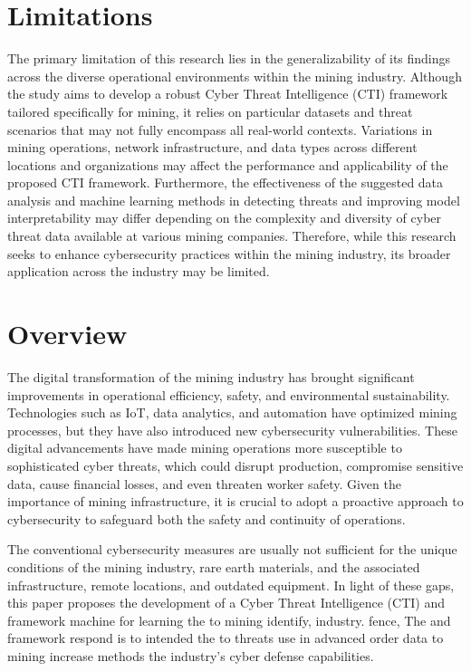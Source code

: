 \documentclass[a4paper,twoside,12pt]{report}
\begin{document}
\section{Limitations}
The primary limitation of this research lies in the generalizability of its findings across the diverse operational environments within the mining industry. Although the study aims to develop a robust Cyber Threat Intelligence (CTI) framework tailored specifically for mining, it relies on particular datasets and threat scenarios that may not fully encompass all real-world contexts. Variations in mining operations, network infrastructure, and data types across different locations and organizations may affect the performance and applicability of the proposed CTI framework. Furthermore, the effectiveness of the suggested data analysis and machine learning methods in detecting threats and improving model interpretability may differ depending on the complexity and diversity of cyber threat data available at various mining companies. Therefore, while this research seeks to enhance cybersecurity practices within the mining industry, its broader application across the industry may be limited.

\section{Overview}
The digital transformation of the mining industry has brought significant improvements in operational efficiency, safety, and environmental sustainability. Technologies such as IoT, data analytics, and automation have optimized mining processes, but they have also introduced new cybersecurity vulnerabilities. These digital advancements have made mining operations more susceptible to sophisticated cyber threats, which could disrupt production, compromise sensitive data, cause financial losses, and even threaten worker safety. Given the importance of mining infrastructure, it is crucial to adopt a proactive approach to cybersecurity to safeguard both the safety and continuity of operations.

The conventional cybersecurity measures are usually not sufficient for the unique conditions of the mining industry, rare earth materials, and the associated infrastructure, remote locations, and outdated equipment. In light of these gaps, this paper proposes the development of a Cyber Threat Intelligence (CTI) and framework machine for learning the to mining identify, industry. fence, The and framework respond is to intended the to threats use in advanced order data to mining increase methods the industry’s cyber defense capabilities.
\end{document}
